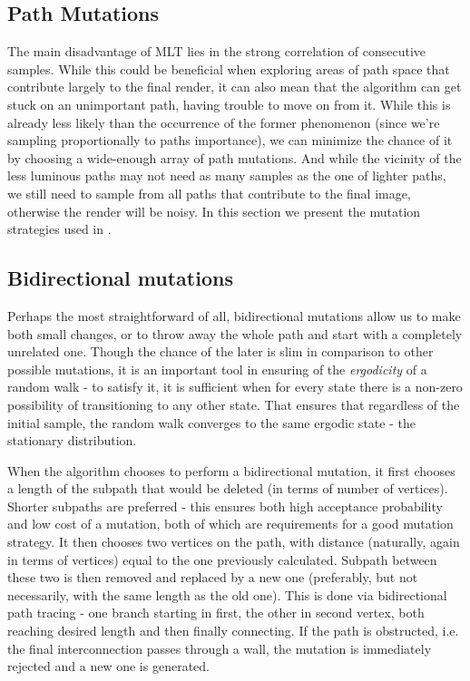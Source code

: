 \subsection{Path Mutations}

The main disadvantage of MLT lies in the strong correlation of consecutive samples. While this could be beneficial when exploring areas of path space that contribute largely to the final render, it can also mean that the algorithm can get stuck on an unimportant path, having trouble to move on from it. While this is already less likely than the occurrence of the former phenomenon (since we're sampling proportionally to paths importance), we can minimize the chance of it by choosing a wide-enough array of path mutations. And while the vicinity of the less luminous paths may not need as many samples as the one of lighter paths, we still need to sample from all paths that contribute to the final image, otherwise the render will be noisy. In this section we present the mutation strategies used in \cite{Veach:1997:MLT:258734.258775}.

\subsection{Bidirectional mutations}

Perhaps the most straightforward of all, bidirectional mutations allow us to make both small changes, or to throw away the whole path and start with a completely unrelated one. Though the chance of the later is slim in comparison to other possible mutations, it is an important tool in ensuring of the \emph{ergodicity} of a random walk - to satisfy it, it is sufficient when for every state there is a non-zero possibility of transitioning to any other state. That ensures that regardless of the initial sample, the random walk converges to the same ergodic state - the stationary distribution.

When the algorithm chooses to perform a bidirectional mutation, it first chooses a length of the subpath that would be deleted (in terms of number of vertices). Shorter subpaths are preferred - this ensures both high acceptance probability and low cost of a mutation, both of which are requirements for a good mutation strategy. It then chooses two vertices on the path, with distance (naturally, again in terms of vertices) equal to the one previously calculated. Subpath between these two is then removed and replaced by a new one (preferably, but not necessarily, with the same length as the old one). This is done via bidirectional path tracing - one branch starting in first, the other in second vertex, both reaching desired length and then finally connecting. If the path is obstructed, i.e. the final interconnection passes through a wall, the mutation is immediately rejected and a new one is generated.

